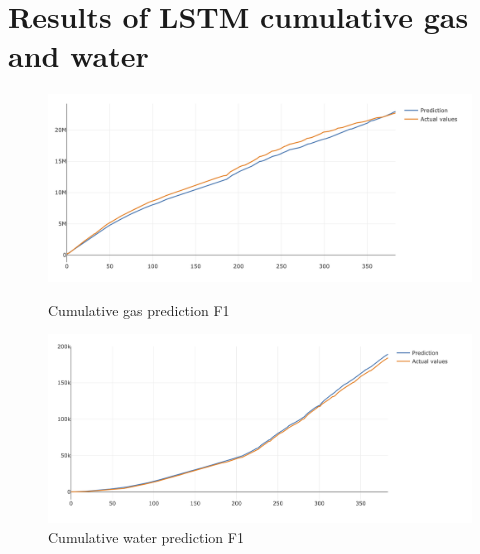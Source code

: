 \documentclass[12pt,a4paper]{report}
\begin{document}
\chapter{Results of LSTM cumulative gas and water}
\begin{figure}[H]
  \includegraphics[width=\linewidth]{LSTM_gas_water/F1_gas}
  \caption{Cumulative gas prediction F1}\label{fig:awesome_image1}
\endminipage\hfill
{}
  \includegraphics[width=\linewidth]{LSTM_gas_water/F1_water}
  \caption{Cumulative water prediction F1}\label{fig:awesome_image2}
\endminipage\hfill
\end{figure}
\end{document}
